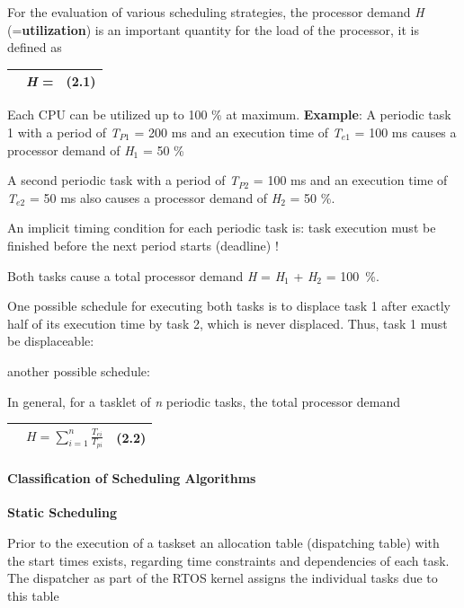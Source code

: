 For the evaluation of various scheduling strategies, the processor demand \textit{H} (=\textbf{utilization}) is an important quantity for the load of the processor, it is defined as

\begin{tabular}{|p{0.3in}|p{3.9in}|p{0.4in}|} \hline 
 & \textit{\newline H} =\newline  & (2.1) \\ \hline 
\end{tabular}

Each CPU can be utilized up to 100 \% at maximum.\textbf{  Example}: A periodic task 1 with a period of \textit{T}${}_{P1}$ = 200 ms and an execution time of \textit{T}${}_{e1}$ = 100 ms causes a processor demand of \textit{H}${}_{1}$ = 50 \%

A second periodic task with a period of \textit{T}${}_{P2}$ = 100 ms and an execution time of \textit{T}${}_{e2}$ = 50 ms also causes a processor demand of \textit{H}${}_{2}$ = 50 \%. 

An implicit timing condition for each periodic task is: task execution must be finished before the next period starts (deadline) !

Both tasks cause a total processor demand \textit{H} = \textit{H}${}_{1}$ + \textit{H}${}_{2}$ = 100~\%.

One possible schedule for executing both tasks is to displace task 1 after exactly half of its execution time by task 2, which is never displaced. Thus, task 1 must be displaceable:

another possible schedule:

In general, for a tasklet of \textit{n} periodic tasks, the total processor demand

\begin{tabular}{|p{0.3in}|p{3.9in}|p{0.4in}|} \hline 
 &         $H=\sum _{i=1}^{n}\frac{T_{ei} }{T_{pi} }  $ & (2.2) \\ \hline 
\end{tabular}

\paragraph{  Classification of Scheduling Algorithms}

\textbf{Static Scheduling}

Prior to the execution of a taskset an allocation table (dispatching table) with the start times exists, regarding time constraints and dependencies of each task. The dispatcher as part of the RTOS kernel assigns the individual tasks due to this table 

